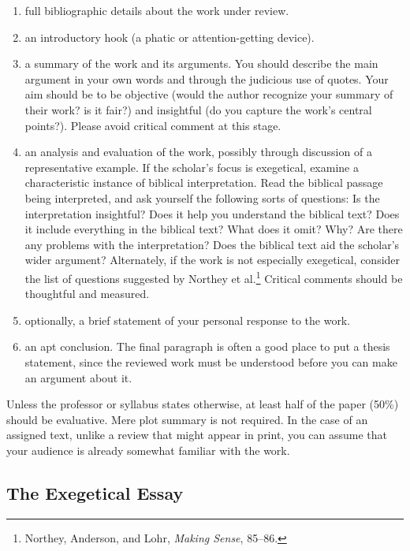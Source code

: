 \documentclass[11pt]{article}
\begin{document}
\begin{enumerate}

\item full bibliographic details about the work under review.

\item an introductory hook (a phatic or attention-getting device).

\item a summary of the work and its arguments. You should describe the
main argument in your own words and through the judicious
use of quotes. Your aim should be to be objective (would the author
recognize your summary of their work? is it fair?) and insightful (do
you capture the work's central points?). Please avoid critical
comment at this stage.

\item an analysis and evaluation of the work, possibly through
discussion of a representative example. If the scholar's focus is
exegetical, examine a characteristic instance of biblical
interpretation. Read the biblical passage being interpreted, and ask
yourself the following sorts of questions: Is the interpretation
insightful? Does it help you understand the biblical text? Does it
include everything in the biblical text? What does it omit? Why? Are
there any problems with the interpretation? Does the biblical text aid
the scholar’s wider argument? Alternately, if the work is not especially
exegetical, consider the list of questions suggested by Northey et
al.\footnote{Northey, Anderson, and Lohr, \emph{Making Sense}, 85–86.}
Critical comments should be thoughtful and measured.

\item optionally, a brief statement of your personal response to the
work.

\item an apt conclusion. The final paragraph is often a good place to
put a thesis statement, since the reviewed work must be understood
before you can make an argument about it.

\end{enumerate}

Unless the professor or syllabus states otherwise, at least half of the
paper (50\%) should be evaluative. Mere plot summary is not required. In
the case of an assigned text, unlike a review that might appear in
print, you can assume that your audience is already somewhat familiar
with the work.

\subsection{The Exegetical Essay}
\end{document}
